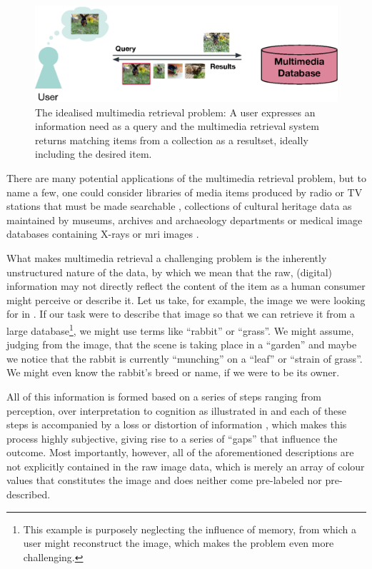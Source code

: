 \begin{figure}[tb]
    \centering
    \includegraphics[width=\textwidth]{figures/mr-ideal.eps}
    \caption{The idealised multimedia retrieval problem: A user expresses an information need as a query and the multimedia retrieval system returns matching items from a collection as a resultset, ideally including the desired item.}
    \label{figure:mr-ideal}
\end{figure}

There are many potential applications of the multimedia retrieval problem, but to name a few, one could consider libraries of media items produced by radio or TV stations that must be made searchable \cite{Watanabe:1998Multimedia}, collections of cultural heritage data as maintained by museums, archives and archaeology departments \cite{Tsai:2007Review} or medical image databases containing X-rays or \acrshort{mri} images \cite{Mueller:2004Review}.

What makes multimedia retrieval a challenging problem is the inherently unstructured nature of the data, by which we mean that the raw, (digital) information may not directly reflect the content of the item as a human consumer might perceive or describe it. Let us take, for example, the image we were looking for in . If our task were to describe that image so that we can retrieve it from a large database\footnote{This example is purposely neglecting the influence of memory, from which a user might reconstruct the image, which makes the problem even more challenging.}, we might use terms like ``rabbit'' or ``grass''. We might assume, judging from the image, that the scene is taking place in a ``garden'' and maybe we notice that the rabbit is currently ``munching'' on a ``leaf'' or ``strain of grass''. We might even know the rabbit's breed or name, if we were to be its owner.

All of this information is formed based on a series of steps ranging from perception, over interpretation to cognition as illustrated in  and each of these steps is accompanied by a loss or distortion of information \cite{Javanmardi:2021Exploring,Rossetto:2018thesis}, which makes this process highly subjective, giving rise to a series of ``gaps'' that influence the outcome. Most importantly, however, all of the aforementioned descriptions are not explicitly contained in the raw image data, which is merely an array of colour values that constitutes the image and does neither come pre-labeled nor pre-described.

